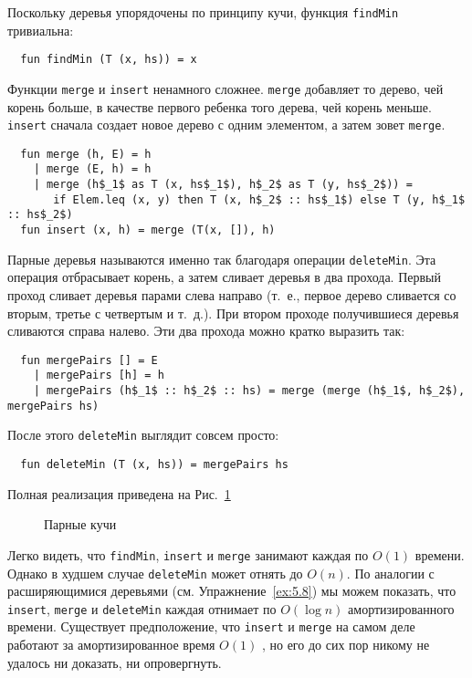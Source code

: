 Поскольку деревья упорядочены по принципу кучи, функция
\lstinline!findMin! тривиальна:
\begin{lstlisting}
  fun findMin (T (x, hs)) = x
\end{lstlisting}
Функции \lstinline!merge! и \lstinline!insert! ненамного
сложнее. \lstinline!merge! добавляет то дерево, чей корень больше, в
качестве первого ребенка того дерева, чей корень
меньше. \lstinline!insert! сначала создает новое дерево с одним
элементом, а затем зовет \lstinline!merge!.
\begin{lstlisting}
  fun merge (h, E) = h
    | merge (E, h) = h
    | merge (h$_1$ as T (x, hs$_1$), h$_2$ as T (y, hs$_2$)) =
       if Elem.leq (x, y) then T (x, h$_2$ :: hs$_1$) else T (y, h$_1$ :: hs$_2$)
  fun insert (x, h) = merge (T(x, []), h)
\end{lstlisting}
Парные деревья называются именно так благодаря операции
\lstinline!deleteMin!. Эта операция отбрасывает корень, а затем
сливает деревья в два прохода. Первый проход сливает деревья парами
слева направо (т.~е., первое дерево сливается со вторым, третье с
четвертым и т.~д.). При втором проходе получившиеся деревья сливаются
справа налево. Эти два прохода можно кратко выразить так:
\begin{lstlisting}
  fun mergePairs [] = E
    | mergePairs [h] = h
    | mergePairs (h$_1$ :: h$_2$ :: hs) = merge (merge (h$_1$, h$_2$), mergePairs hs)
\end{lstlisting}
После этого \lstinline!deleteMin! выглядит совсем просто:
\begin{lstlisting}
  fun deleteMin (T (x, hs)) = mergePairs hs
\end{lstlisting}
Полная реализация приведена на Рис.~\ref{fig:5.6}

\begin{figure}
  \centering
  
  \caption{Парные кучи}
  \label{fig:5.6}
\end{figure}

Легко видеть, что \lstinline!findMin!, \lstinline!insert! и
\lstinline!merge! занимают каждая по $O(1)$ времени. Однако в худшем
случае \lstinline!deleteMin! может отнять до $O(n)$. По аналогии с
расширяющимися деревьями (см. Упражнение~\ref{ex:5.8}) мы можем
показать, что \lstinline!insert!, \lstinline!merge! и
\lstinline!deleteMin! каждая отнимает по $O(\log n)$ амортизированного
времени. Существует предположение, что \lstinline!insert! и
\lstinline!merge! на самом деле работают за амортизированное время
$O(1)$ \cite{Fredmaneta1986}, но его до сих пор никому не удалось ни
доказать, ни опровергнуть.

